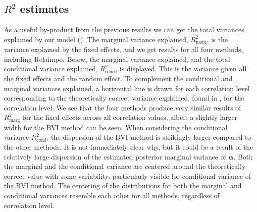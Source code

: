 \subsection{\texorpdfstring{$R^2$}{Lg} estimates}
\label{sec:R2} 
As a useful by-product from the previous results we can get the total variances explained by our model ().
The marginal variance explained, $R^2_{\text{marg}}$, is the variance explained by the fixed effects, and we get results for all four methods, including Relaimpo.
Below, the marginal variance explained, and the total conditional variance explained, $R^2_{\text{cond}}$, is displayed. 
This is the variance given all the fixed effects and the random effect.
To complement the conditional and marginal variances explained, a horizontal line is drawn for each correlation level corresponding to the theoretically correct variance explained, found in , for the correlation level. 
\newline
\newline
We see that the four methods produce very similar results of $R^2_{\text{marg}}$ for the fixed effects across all correlation values, albeit a slightly larger width for the BVI method can be seen.
When considering the conditional variance $R^2_{\text{cond}}$, the dispersion of the BVI method is strikingly larger compared to the other methods. 
It is not immediately clear why, but it could be a result of the relatively large dispersion of the estimated posterior marginal variance of $\boldsymbol{\alpha}$.
Both the marginal and the conditional variance are centered around the theoretically correct value with some variability, particularly visible for conditional variance of the BVI method. 
The centering of the distributions for both the marginal and conditional variances resemble each other for all methods, regardless of correlation level.
